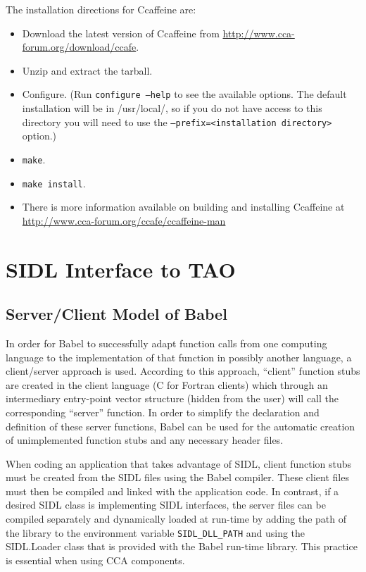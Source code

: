 \documentclass[doublespacing,12pt]{article}
\begin{document}
The installation directions for Ccaffeine are:
\begin{itemize}
\item Download the latest version of Ccaffeine from \url{http://www.cca-forum.org/download/ccafe}.
\item Unzip and extract the tarball.
\item Configure. (Run \texttt{configure --help} to see the available
  options.  The default installation will be in /usr/local/, so if you
  do not have access to this directory you will need to use the
  \texttt{--prefix=<installation directory>} option.)
\item \texttt{make}.
\item \texttt{make install}.  
\item There is more information available on building and installing Ccaffeine at \url{http://www.cca-forum.org/ccafe/ccaffeine-man}
\end{itemize}



\section{SIDL Interface to TAO}\label{sec:SIDLInterface}


\subsection{Server/Client Model of Babel}
In order for Babel to successfully adapt function calls from one
computing language to the implementation of that function in possibly another
language, a client/server approach is used.  According to this
approach, ``client'' function stubs
are created in the client language (C for Fortran clients) which 
through an intermediary entry-point vector structure (hidden from the
user) will call the corresponding
``server'' function.  In order to simplify the declaration and
definition of these server functions, Babel can be used for the
automatic creation of unimplemented function stubs and any necessary
header files.  

When coding an application that takes advantage of SIDL, client
function stubs must be created from the SIDL files using the Babel
compiler.  These client files must then be compiled and linked with
the application code.  In contrast, if a desired SIDL class is
implementing
SIDL interfaces, the server files can be compiled
separately and dynamically loaded at run-time by adding the path of 
the library to
the environment variable \texttt{SIDL\_DLL\_PATH} and using the
\textsf{SIDL.Loader} class that is provided with the Babel run-time
library.  This practice is essential when using CCA components.
\end{document}
